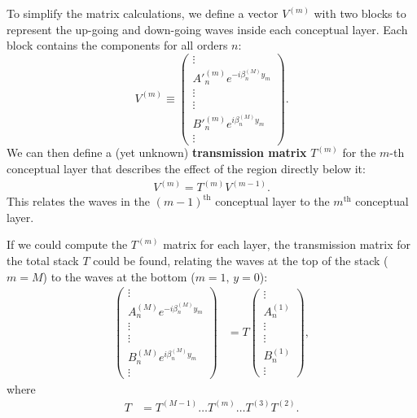To simplify the matrix calculations, we define a vector $V^{(m)}$ with two blocks to represent the up-going and down-going waves inside each conceptual layer.  Each block contains the components for all orders $n$:
\begin{equation}
V^{(m)} \equiv  \left(\begin{array}{c}\vdots \\ A'^{(m)}_n  e^{-i \beta^{(M)}_n y_m} \\ \vdots \\\hline \vdots \\ B'^{(m)}_n e^{i \beta^{(M)}_n y_m} \\ \vdots\end{array}\right) .
\end{equation}
We can then define a (yet unknown) \textbf{transmission matrix} $T^{(m)}$ for the $m$-th conceptual layer that describes the effect of the region directly below it:
\begin{align}
V^{(m)} = T^{(m)} V^{(m-1)}.
\end{align}
This relates the waves in the $(m-1)^\textrm{th}$ conceptual layer to the $m^\textrm{th}$ conceptual layer.

If we could compute the $T^{(m)}$ matrix for each layer, the transmission matrix for the total stack $T$ could be found, relating the waves at the top of the stack ($m=M$) to the waves at the bottom ($m=1,\, y=0$):
\begin{align}
\left(\begin{array}{c}\vdots \\ A^{(M)}_n  e^{-i \beta^{(M)}_n y_m} \\ \vdots \\\hline \vdots \\ B^{(M)}_n e^{i \beta^{(M)}_n y_m} \\ \vdots\end{array}\right)  &= T \left(\begin{array}{c}\vdots \\ A^{(1)}_n \\ \vdots \\\hline \vdots \\ B^{(1)}_n \\ \vdots\end{array}\right),
\end{align}
where
\begin{align}
T &= T^{(M-1)} \ldots T^{(m)} \ldots T^{(3)} T^{(2)}.
\end{align}

